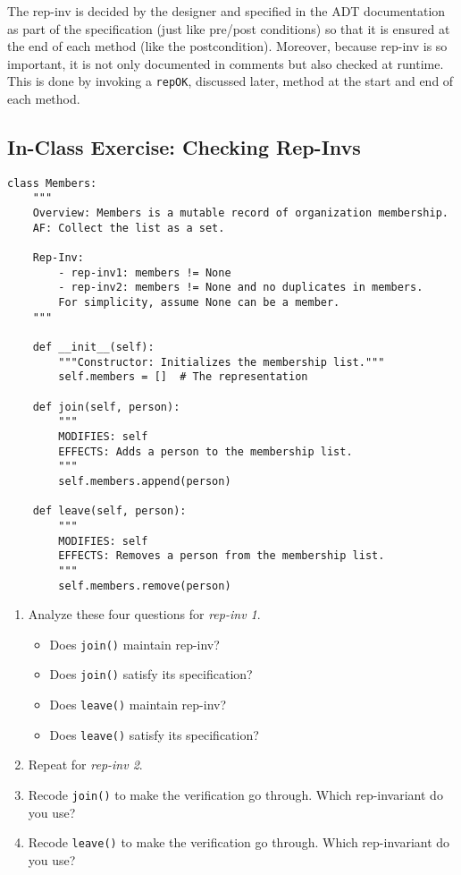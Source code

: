 \documentclass[oneside,11pt,dvipsnames]{book}
\newcommand{\code}[1]{\texttt{#1}}
\begin{document}
The rep-inv is decided by the designer and specified in the ADT documentation as part of the specification (just like pre/post conditions) so that it is ensured at the end of each method (like the postcondition). Moreover, because rep-inv is so important, it is not only documented in comments but also checked at runtime.  This is done by invoking a \code{repOK}, discussed later, method at the start and end of each method.

\subsection{In-Class Exercise: Checking Rep-Invs}  %

\begin{lstlisting}
class Members:
    """
    Overview: Members is a mutable record of organization membership.
    AF: Collect the list as a set.
    
    Rep-Inv:
        - rep-inv1: members != None
        - rep-inv2: members != None and no duplicates in members.
        For simplicity, assume None can be a member.
    """

    def __init__(self):
        """Constructor: Initializes the membership list."""
        self.members = []  # The representation

    def join(self, person):
        """
        MODIFIES: self
        EFFECTS: Adds a person to the membership list.
        """
        self.members.append(person)

    def leave(self, person):
        """
        MODIFIES: self
        EFFECTS: Removes a person from the membership list.
        """
        self.members.remove(person)
\end{lstlisting}

\begin{enumerate}
\item Analyze these four questions for \emph{rep-inv 1}.
\begin{itemize}
    \item Does \code{join()} maintain rep-inv?
    \item Does \code{join()} satisfy its specification?
    \item Does \code{leave()} maintain rep-inv?
    \item Does \code{leave()} satisfy its specification?
\end{itemize}
\item Repeat for \emph{rep-inv 2}.
\item Recode \code{join()} to make the verification go through. Which rep-invariant do you use?
\item Recode \code{leave()} to make the verification go through. Which rep-invariant do you use?
\end{enumerate}
\end{document}
